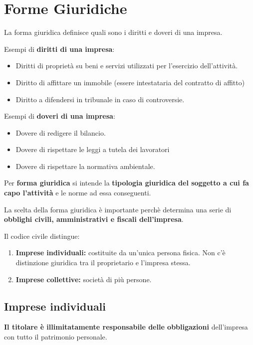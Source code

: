 \documentclass[../main.tex]{subfiles}
\begin{document}
\section{Forme Giuridiche}

La forma giuridica definisce quali sono i diritti e doveri di una impresa.

Esempi di \textbf{diritti di una impresa}:
\begin{itemize}
	\item Diritti di proprietà su beni e servizi utilizzati per l'esercizio dell'attività.
	\item Diritto di affittare un immobile (essere intestataria del contratto di affitto)
	\item Diritto a difendersi in tribunale in caso di controversie.
\end{itemize}

Esempi di \textbf{doveri di una impresa}:
\begin{itemize}
	\item Dovere di redigere il bilancio.
	\item Dovere di rispettare le leggi a tutela dei lavoratori
	\item Dovere di rispettare la normativa ambientale.
\end{itemize}

Per \textbf{forma giuridica} si intende la \textbf{tipologia giuridica del soggetto a cui fa capo l'attività} e le norme ad essa conseguenti.

La scelta della forma giuridica è importante perchè determina una serie di \textbf{obblighi civili, amministrativi e fiscali dell'impresa}.

Il codice civile distingue:

\begin{enumerate}
	\item \textbf{Imprese individuali:} costituite  da un'unica persona fisica. Non c'è distinzione giuridica tra il proprietario e l'impresa stessa.

	\item \textbf{Imprese collettive:} società di più persone.
\end{enumerate}

\subsection{Imprese individuali}

\textbf{Il titolare è illimitatamente responsabile delle obbligazioni} dell'impresa con tutto il patrimonio personale.
\end{document}
